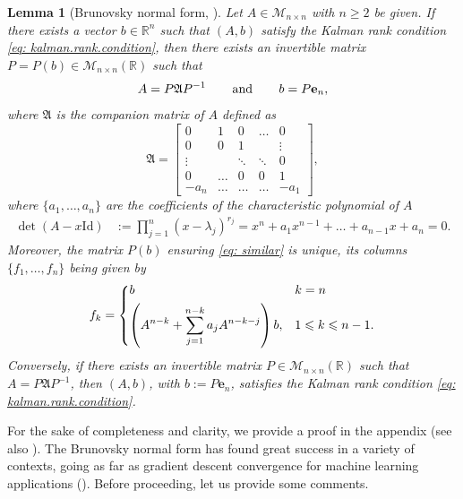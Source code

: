 \documentclass[11pt, a4paper, reqno]{amsart}
\newcommand{\R}{\mathbb{R}}
\theoremstyle{plain}
\numberwithin{equation}{section}
\newtheorem{lemma}{Lemma}[section]
\begin{document}
	
	\begin{lemma}[Brunovsky normal form, \citep{brunovsky1970classification}] \label{lem: brunovski}
	Let $A\in\mathcal{M}_{n\times n}$ with $n\geqslant 2$ be given.
	If there exists a vector $b\in\R^n$ such that $(A,b)$ satisfy the Kalman rank condition \eqref{eq: kalman.rank.condition}, then there exists an invertible matrix $P=P(b)\in\mathcal{M}_{n\times n}(\R)$ 
	such that 
	\begin{equation} \label{eq: similar}
	A=P\mathfrak{A}P^{-1} \hspace{0.5cm} \text{ and } \hspace{0.5cm} b=P\mathbf{e}_n,
	\end{equation}
	where $\mathfrak{A}$ is the companion matrix of $A$ defined as
	\begin{equation} \label{eq: y.system.def}
	\mathfrak{A} = \begin{bmatrix} 0& 1& 0& \ldots& 0 \\ 
						     0& 0& 1& & \vdots \\
						     \vdots&  &\ddots& \ddots& 0 \\
						     0& \ldots& 0 & 0 & 1 \\
						     -a_n& \hdots &\hdots &\hdots & -a_1 
				\end{bmatrix},
	\end{equation}
	where $\{a_1, \ldots, a_n\}$ are the coefficients of the characteristic polynomial of $A$
	\begin{align*}
	\det(A-x\mathrm{Id}) &:= \prod_{j=1}^n (x-\lambda_j)^{r_j} = x^n + a_1x^{n-1} + \ldots + a_{n-1} x + a_n= 0.
	\end{align*}
	Moreover, the matrix $P(b)$ ensuring \eqref{eq: similar} is unique, its columns $\{f_1,\ldots,f_n\}$ being given by
	\begin{equation} \label{eq: analy.def.fk}
	f_k = 
	\begin{dcases}
	b & k=n \\
	\left(A^{n-k} + \sum_{j=1}^{n-k} a_{j} A^{n-k-j}\right) b, & 1\leqslant k \leqslant n-1.
	\end{dcases}
	\end{equation}
	Conversely, if there exists an invertible matrix $P\in\mathcal{M}_{n\times n}(\R)$ such that $A=P\mathfrak{A}P^{-1}$, then $(A,b)$, with $b:=P\mathbf{e}_n$, satisfies the Kalman rank condition \eqref{eq: kalman.rank.condition}.
	\end{lemma}
	
	\noindent
	For the sake of completeness and clarity, we provide a proof in the appendix (see also \citep{brunovsky1970classification, trelat2005controle}). The Brunovsky normal form has found great success in a variety of contexts, going as far as  gradient descent convergence for machine learning applications (\citep{hardt2016gradient}). Before proceeding, let us provide some comments.
	
\end{document}
